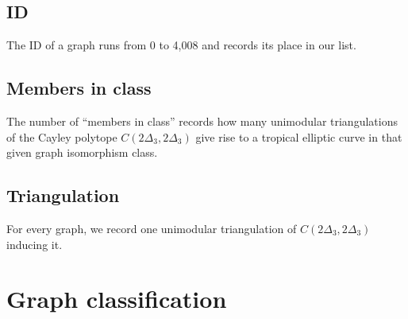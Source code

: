 \documentclass[a4paper, DIV=17, twocolumn]{scrartcl}
\begin{document}
\subsection{ID}
 The ID of a graph runs from $0$ to 4,008 and records its place in our list.

\subsection{Members in class}
The number of \enquote{members in class} records how many unimodular triangulations of the Cayley polytope $C(2\Delta_3, 2\Delta_3)$ give rise to a tropical elliptic curve in that given graph isomorphism class.

\subsection{Triangulation}
For every graph, we record one unimodular triangulation of $C(2\Delta_3, 2\Delta_3)$ inducing it. 

\section{Graph classification}
\setlength{\parindent}{0pt}

\end{document}
